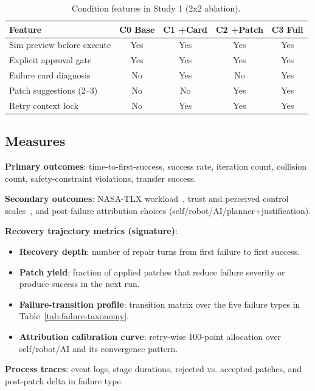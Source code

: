 \documentclass[sigconf,review,anonymous]{acmart}
\begin{document}
\begin{table}[t]
  \caption{Condition features in Study 1 (2x2 ablation).}
  \label{tab:conditions}
  \centering
  \scriptsize
  \begin{tabular}{p{2.35cm}cccc}
    \toprule
    Feature & C0 Base & C1 +Card & C2 +Patch & C3 Full \\
    \midrule
    Sim preview before execute & Yes & Yes & Yes & Yes \\
    Explicit approval gate & Yes & Yes & Yes & Yes \\
    Failure card diagnosis & No & Yes & No & Yes \\
    Patch suggestions (2--3) & No & No & Yes & Yes \\
    Retry context lock & No & Yes & Yes & Yes \\
    \bottomrule
  \end{tabular}
  \normalsize
\end{table}

\subsection{Measures}
\textbf{Primary outcomes}: time-to-first-success, success rate, iteration count, collision count, safety-constraint violations, transfer success.

\textbf{Secondary outcomes}: NASA-TLX workload~\cite{hart1988nasa}, trust and perceived control scales~\cite{lee2004trust,hancock2011meta}, and post-failure attribution choices (self/robot/AI/planner+justification).

\textbf{Recovery trajectory metrics (signature)}:
\begin{itemize}
  \item \textbf{Recovery depth}: number of repair turns from first failure to first success.
  \item \textbf{Patch yield}: fraction of applied patches that reduce failure severity or produce success in the next run.
  \item \textbf{Failure-transition profile}: transition matrix over the five failure types in Table~\ref{tab:failure-taxonomy}.
  \item \textbf{Attribution calibration curve}: retry-wise 100-point allocation over self/robot/AI and its convergence pattern.
\end{itemize}

\textbf{Process traces}: event logs, stage durations, rejected vs. accepted patches, and post-patch delta in failure type.
\end{document}
